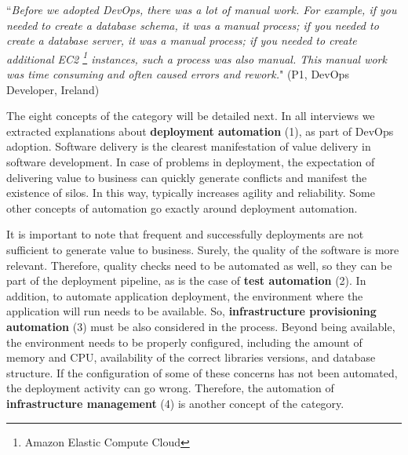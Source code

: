 \begin{mq}
``\emph{Before we adopted DevOps, there was a lot of manual work. For example, if you
needed to create a database schema, it was a manual process; if you needed to create a
database server, it was a manual process; if you needed to create additional EC2 \footnote{Amazon Elastic
Compute Cloud} instances, such a process was also manual.
This manual work was time consuming and often caused errors and
rework.}" (P1, DevOps Developer, Ireland)
\end{mq}


The eight concepts of the  category will be detailed next.
In all interviews we extracted explanations about \textbf{deployment
automation} (1), as part of DevOps adoption. Software delivery is the clearest
manifestation of value delivery in software development. In case of problems
in deployment, the expectation of delivering value to business can quickly
generate conflicts and manifest the existence of silos.
In this way,  typically increases agility and reliability. Some other
concepts of automation go exactly around deployment automation.

It is important to note that frequent and successfully
deployments are not sufficient to generate value to business. Surely, the quality of
the software is more relevant. Therefore, quality checks need to be automated as well, so they can be part of the
deployment pipeline, as is the case of \textbf{test automation} (2). In addition, to
automate application deployment, the environment where the
application will run needs to be available. So, \textbf{infrastructure
provisioning automation} (3) must be also considered in the process. Beyond being available,
the environment needs to be properly configured, including the amount of memory and CPU,
availability of the correct libraries versions, and database structure. If the configuration of some of these concerns
has not been automated, the deployment activity can go wrong. Therefore,
the automation of \textbf{infrastructure management} (4) is another
concept of the  category.

